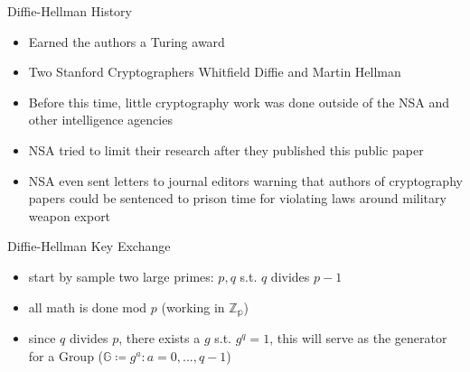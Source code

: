 \documentclass[handout]{beamer}
\begin{document}
\begin{frame}{Diffie-Hellman History}
    \begin{itemize}
        \item \pause Earned the authors a Turing award
        \item \pause Two Stanford Cryptographers Whitfield Diffie and Martin Hellman
        \item \pause Before this time, little cryptography work was done outside of the NSA and other intelligence agencies
        \item \pause NSA tried to limit their research after they published this public paper
        \item \pause NSA even sent letters to journal editors warning that authors of cryptography papers could be sentenced to prison time for violating laws around military weapon export
    \end{itemize}
\end{frame}

\begin{frame}{Diffie-Hellman Key Exchange}
    \begin{itemize}
        \item start by sample two large primes: \(p, q\) s.t. \(q\) divides \(p - 1\)
        \item all math is done mod \(p\) (working in \(\mathbb{Z_p}\))
        \item since \(q\) divides \(p\), there exists a \(g\) s.t. \(g^q = 1\), this will serve as the generator for a Group (\(\mathbb{G}  \coloneqq {g^a: a = 0, ..., q - 1}\))
    \end{itemize}
\end{frame}
\end{document}
